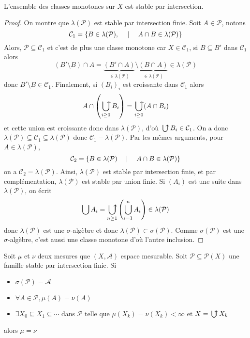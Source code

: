
\begin{rem}
L'ensemble des classes monotones sur $X$ est stable par intersection.
\end{rem}

\begin{proof}
    On montre que $\lambda(\mathcal  P)$ est stable par intersection finie. Soit $A \in  \mathcal  P$, notons \[
        \mathcal  C_1 = \left\{ B \in  \lambda (\mathcal  P), \quad  \suchthat \quad  A\cap B \in  \lambda (\mathcal  P) \right\} 
    \]
    Alors, $\mathcal  P\subseteq \mathcal  C_1$ et c'est de plus une classe monotone car $X \in  \mathcal  C_1$, si $B\subseteq B'$ dans  $\mathcal C_1$ alors \[
        (B' \setminus B)\cap A = \underbrace{(B'\cap A)}_{\in \lambda(\mathcal  P)} \setminus  \underbrace{(B\cap A)}_{\in  \lambda(\mathcal P)} \in \lambda(\mathcal  P)
    \] 
    donc $B' \setminus B \in \mathcal  C_1$. Finalement, si $(B_i)_i$ est croissante dans  $\mathcal  C_1$ alors \[
        A\cap \left( \ubigcup_{i\geq 0} B_i \right)= \ubigcup_{i\geq 0}(A\cap B_i)
    \] 
    et cette union est croissante donc dans $\lambda(\mathcal  P)$, d'où $\ubigcup B_i \in  \mathcal  C_1$. On a donc $\lambda(\mathcal  P)\subseteq \mathcal  C_1\subseteq \lambda(\mathcal  P)$ donc $\mathcal  C_1 - \lambda(\mathcal  P)$. Par les mêmes arguments, pour $A \in  \lambda(\mathcal  P)$, \[
        \mathcal  C_2 = \left\{ B \in  \lambda(\mathcal  P) \quad \suchthat \quad  A\cap B \in  \lambda(\mathcal  P)  \right\} 
    \] 
    on a $\mathcal  C_2=\lambda(\mathcal  P)$. Ainsi, $\lambda(\mathcal  P)$ est stable par intersection finie, et par complémentation, $\lambda(\mathcal  P)$ est stable par union finie. Si  $(A_i)$ est une suite dans  $\lambda(\mathcal  P)$, on écrit \[
        \bigcup A_i=\ubigcup_{n\geq 1} \left(\bigcup_{i=1}^nA_i\right) \in \lambda(\mathcal  P)
    \] 
    donc $\lambda(\mathcal  P)$ est une $\sigma$-algèbre et donc  $\lambda(\mathcal  P)\subset \sigma(\mathcal  P)$. Comme $\sigma(\mathcal  P)$ est une $\sigma$-algèbre, c'est aussi une classe monotone d'où l'autre inclusion.
\end{proof}

\begin{cor}
    Soit $\mu$ et  $\nu$ deux mesures que  $(X, \mathcal  A)$ espace mesurable. Soit $\mathcal  P \subseteq \mathcal  P(X)$ une famille stable par intersection finie. Si \begin{itemize}
        \item $\sigma(\mathcal  P)=\mathcal  A$
        \item $\forall  A \in  \mathcal P, \mu(A)=\nu(A)$
        \item $ \exists  X_0\subseteq X_1\subseteq \cdots $ dans $\mathcal  P$ telle que $\mu(X_k)=\nu(X_k)<\infty$ et  $X=\ubigcup X_k$
    \end{itemize}
    alors $\mu=\nu$
\end{cor}

